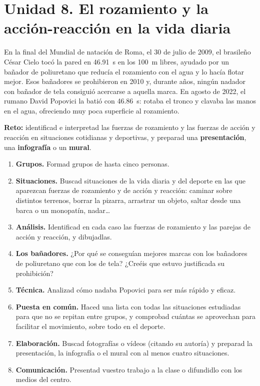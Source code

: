 \section{Unidad 8. El rozamiento y la acción-reacción en la vida diaria}

En la final del Mundial de natación de Roma, el 30 de julio de 2009, el brasileño César Cielo tocó la pared en \qty{46.91}{\s} en los \qty{100}{\m} libres, ayudado por un bañador de poliuretano que reducía el rozamiento con el agua y lo hacía flotar mejor. Esos bañadores se prohibieron en 2010 y, durante años, ningún nadador con bañador de tela consiguió acercarse a aquella marca. En agosto de 2022, el rumano David Popovici la batió con \qty{46.86}{\s}: rotaba el tronco y clavaba las manos en el agua, ofreciendo muy poca superficie al rozamiento.

\begin{marker}
    \textbf{Reto:} identificad e interpretad las fuerzas de rozamiento y las fuerzas de acción y reacción en situaciones cotidianas y deportivas, y preparad una \textbf{presentación}, una \textbf{infografía} o un \textbf{mural}.
\end{marker}

\begin{enumerate}[label=\numberballred]
    \item \textbf{Grupos.} Formad grupos de hasta cinco personas.
    \item \textbf{Situaciones.} Buscad situaciones de la vida diaria y del deporte en las que aparezcan fuerzas de rozamiento y de acción y reacción: caminar sobre distintos terrenos, borrar la pizarra, arrastrar un objeto, saltar desde una barca o un monopatín, nadar\ldots
    \item \textbf{Análisis.} Identificad en cada caso las fuerzas de rozamiento y las parejas de acción y reacción, y dibujadlas.
    \item \textbf{Los bañadores.} ¿Por qué se conseguían mejores marcas con los bañadores de poliuretano que con los de tela? ¿Creéis que estuvo justificada su prohibición?
    \item \textbf{Técnica.} Analizad cómo nadaba Popovici para ser más rápido y eficaz.
    \item \textbf{Puesta en común.} Haced una lista con todas las situaciones estudiadas para que no se repitan entre grupos, y comprobad cuántas se aprovechan para facilitar el movimiento, sobre todo en el deporte.
    \item \textbf{Elaboración.} Buscad fotografías o vídeos (citando su autoría) y preparad la presentación, la infografía o el mural con al menos cuatro situaciones.
    \item \textbf{Comunicación.} Presentad vuestro trabajo a la clase o difundidlo con los medios del centro.
\end{enumerate}

